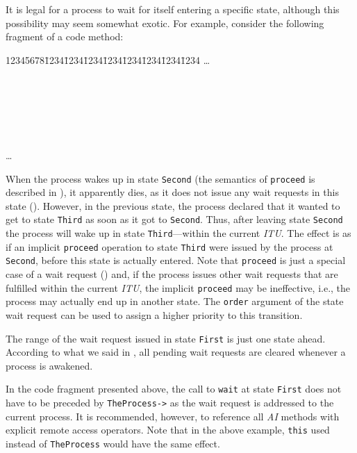 It is legal for a process to wait for itself entering a specific state,
although this possibility may seem somewhat exotic.
For example, consider the following fragment of a code method:
{\tt\begin{tabbing}
12345678\=1234\=1234\=1234\=1234\=1234\=1234\=1234\=1234\kill
\>\ldots \\
 \\
\> \\
\> \\
 \\
\>  \\
 \\
\> \ldots \\
\end{tabbing}}
When the process wakes up in state {\tt Second} (the semantics of {\tt proceed}
is described in ), it apparently dies, as it does not issue any
wait requests in this state ().
However, in the previous state, the process declared that it wanted to get to
state {\tt Third} as soon as it got to {\tt Second}.
Thus, after leaving state {\tt Second} the process will wake up in state
{\tt Third}---within the current {\em ITU}.
The effect is as if an implicit
{\tt proceed} operation to state {\tt Third} were
issued by the process at {\tt Second}, before this state is actually
entered.
Note that {\tt proceed} is just a special case of a wait request
() and, if the process issues other wait requests that are
fulfilled within the current {\em ITU}, the implicit {\tt proceed} may
be ineffective, i.e., the process may actually end up in another state.
The {\tt order} argument of the state wait request can be used to assign
a higher priority to this transition.

The range of the wait request issued in state {\tt First} is just
one state ahead.
According to what we said in ,
all pending wait requests are cleared whenever a process is awakened.

In the code fragment presented above, the call to {\tt wait} at
state {\tt First} does not have to be preceded by {\tt TheProcess->} as
the wait request is addressed to the current process.
It is recommended, however, to reference all {\em AI\/} methods with
explicit remote access operators.
Note that in the above example,
{\tt this\/} used instead of {\tt TheProcess} would have the same
effect.

